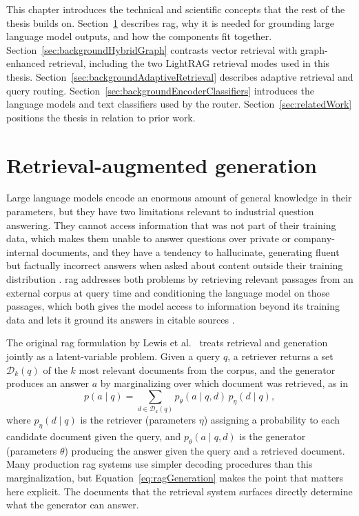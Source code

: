 \documentclass[english, bibtex]{kththesis}               %
\numberwithin{listing}{chapter}
\begin{document}
This chapter introduces the technical and scientific concepts that the rest of the thesis builds on. Section~\ref{sec:backgroundRag} describes \gls{rag}, why it is needed for grounding large language model outputs, and how the components fit together. Section~\ref{sec:backgroundHybridGraph} contrasts vector retrieval with graph-enhanced retrieval, including the two LightRAG retrieval modes used in this thesis. Section~\ref{sec:backgroundAdaptiveRetrieval} describes adaptive retrieval and query routing. Section~\ref{sec:backgroundEncoderClassifiers} introduces the language models and text classifiers used by the router. Section~\ref{sec:relatedWork} positions the thesis in relation to prior work.

\section{Retrieval-augmented generation}
\label{sec:backgroundRag}

Large language models encode an enormous amount of general knowledge in their parameters, but they have two limitations relevant to industrial question answering. They cannot access information that was not part of their training data, which makes them unable to answer questions over private or company-internal documents, and they have a tendency to hallucinate, generating fluent but factually incorrect answers when asked about content outside their training distribution \cite{gao2023ragsurvey}. \Gls{rag} addresses both problems by retrieving relevant passages from an external corpus at query time and conditioning the language model on those passages, which both gives the model access to information beyond its training data and lets it ground its answers in citable sources \cite{gao2023ragsurvey,lewis2020rag}.

The original \gls{rag} formulation by Lewis et al.\ \cite{lewis2020rag} treats retrieval and generation jointly as a latent-variable problem. Given a query \(q\), a retriever returns a set \(\mathcal{D}_k(q)\) of the \(k\) most relevant documents from the corpus, and the generator produces an answer \(a\) by marginalizing over which document was retrieved, as in
\begin{equation}
\label{eq:ragGeneration}
p(a \mid q) =
\sum_{d \in \mathcal{D}_k(q)}
p_\theta(a \mid q,d)\,p_\eta(d \mid q),
\end{equation}
where \(p_\eta(d \mid q)\) is the retriever (parameters \(\eta\)) assigning a probability to each candidate document given the query, and \(p_\theta(a \mid q, d)\) is the generator (parameters \(\theta\)) producing the answer given the query and a retrieved document. Many production \gls{rag} systems use simpler decoding procedures than this marginalization, but Equation~\ref{eq:ragGeneration} makes the point that matters here explicit. The documents that the retrieval system surfaces directly determine what the generator can answer.
\end{document}

